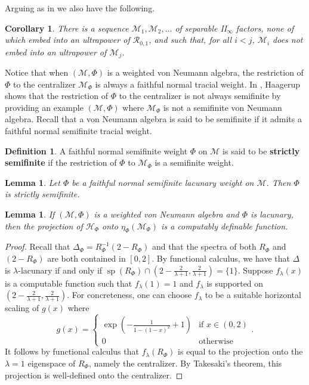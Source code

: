 \documentclass[12pt]{amsart}
\newtheorem{lem}[thm]{Lemma}
\newtheorem{cor}[thm]{Corollary}
\theoremstyle{definition}
\newtheorem{defn}[thm]{Definition}
\def\cal{\mathcal}
\DeclareMathOperator{\spec}{sp}
\newcommand\R{{\cal R}}
\begin{document}
Arguing as in \cite[Corollary 5.5]{GH2} we also have the following.

\begin{cor}
    There is a sequence $\cal M_1, \cal M_2, \ldots$ of separable II$_\infty$ factors, none of which embed into an ultrapower of $\R_{0,1}$, and such that, for all $i < j$, $\cal M_i$ does not embed into an ultrapower of $\cal M_j$.
\end{cor}

Notice that when $(\cal M, \Phi)$ is a weighted von Neumann algebra, the restriction of $\Phi$ to the centralizer $\cal M_{\Phi}$ is always a faithful normal tracial weight.  In \cite{Ha77}, Haagerup shows that the restriction of $\Phi$ to the centralizer is not always semifinite by providing an example $(\cal M, \Phi)$ where $\cal M_{\Phi}$ is not a semifinite von Neumann algebra. Recall that a von Neumann algebra is said to be semifinite if it admits a faithful normal semifinite tracial weight.

\begin{defn}
    A faithful normal semifinite weight $\Phi$ on $\cal M$ is said to be \textbf{strictly semifinite} if the restriction of $\Phi$ to $\cal M_{\Phi}$ is a semifinite weight.
\end{defn}

\begin{lem}{\cite[Lemma 2.3]{HS}}
    Let $\Phi$ be a faithful normal semifinite lacunary weight on $\cal M$. Then $\Phi$ is strictly semifinite. 
\end{lem}

\begin{lem}\label{CentralizerDef}
    If $(\cal M, \Phi)$ is a weighted von Neumann algebra and $\Phi$ is lacunary, then the projection of $\cal H_{\Phi}$ onto $\eta_{\Phi}(\cal M_{\Phi})$ is a computably definable function.
\end{lem}

\begin{proof}
    Recall that $\Delta_{\Phi} = R_{\Phi}^{-1}(2- R_{\Phi})$ and that the spectra of both $R_{\Phi}$ and $(2 - R_{\Phi})$ are both contained in $[0,2]$. By functional calculus, we have that $\Delta$ is $\lambda$-lacunary if and only if $\spec(R_{\Phi}) \cap (2 - \frac{2}{\lambda + 1}, \frac{2}{\lambda + 1}) = \{1\}$. Suppose $f_{\lambda}(x)$ is a computable function such that $f_{\lambda}(1) = 1$ and $f_{\lambda}$ is supported on $(2 - \frac{2}{\lambda + 1}, \frac{2}{\lambda + 1})$. For concreteness, one can choose $f_{\lambda}$ to be a suitable horizontal scaling of $g(x)$ where 
    \[
    g(x) = \begin{cases} 
    \exp \left(-\frac{1}{1-(1-x)^2} + 1 \right) & \text{if } x \in (0,2) \\
    0 & \text{otherwise }
    \end{cases}.
    \]
    It follows by functional calculus that $f_{\lambda}(R_{\Phi})$ is equal to the projection onto the $\lambda = 1$ eigenspace of $R_{\Phi}$, namely the centralizer. By Takesaki's theorem, this projection is well-defined onto the centralizer.
\end{proof}
\end{document}
